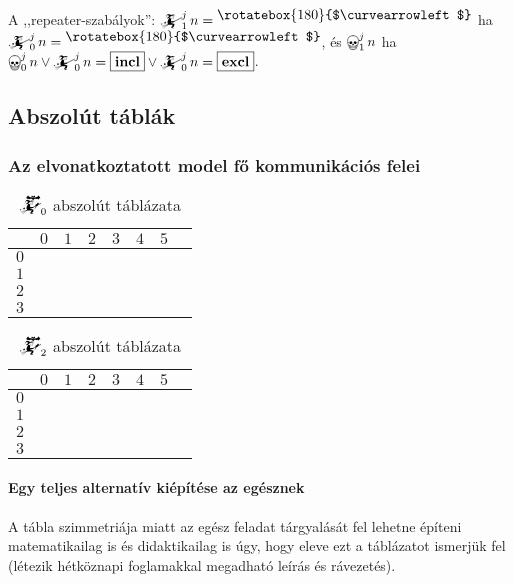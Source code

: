\documentclass{article}
\newcommand{\blk}{\cellcolor{darkgray}}
\newcommand{\red}{\cellcolor{red!33}}
\newcommand{\grn}{\cellcolor{green!33}}
\newcommand{\nothing}{\text{\raisebox{0.4em}{\rotatebox{180}{$\curvearrowleft$}}}}%
\newcommand{\just}[1]{\boxed{#1}}%
\newcommand{\incl}{\mathbf{incl}}
\newcommand{\excl}{\mathbf{excl}}
\newcommand{\mainfun}[3]{\mathwitch_{#1}^{#2}#3}
\newcommand{\nomainfun}[3]{\bigskull_{#1}^{#2}#3}
\newcommand{\currymainfunabs}[1]{\overbat{\mathwitch*_{#1}}}
\begin{document}
	A ,,repeater-szabályok'': $\mainfun1jn = \nothing$ ha $\mainfun0jn = \nothing$, és $\nomainfun1jn$ ha $\nomainfun0jn \lor \mainfun0jn = \just\incl \lor \mainfun0jn = \just\excl$.

	\subsection{Abszolút táblák}

	\subsubsection{Az elvonatkoztatott model fő kommunikációs felei}

	\begin{table}[H]
		\caption*{$\currymainfunabs0$ abszolút táblázata}
		\centering
		\begin{tabular}{c||c|c|c|c|c|c|c|}
				&	$0$		&	$1$		&	$2$		&	$3$		&	$4$		&	$5$		\\\hline\hline
			$0$	&	\nothing	&	\nothing	&	\nothing	&	\nothing	&	\nothing	&	\grn\just\incl	\\\hline
			$1$	&	\red\just\excl	&	\nothing	&	\nothing	&	\nothing	&	\grn\just\incl	&	\blk		\\\hline
			$2$	&	\blk		&	\red\just\excl	&	\nothing	&	\grn\just\incl	&	\blk		&	\blk		\\\hline
			$3$	&	\blk		&	\blk		&	\blk		&	\blk		&	\blk		&	\blk		\\\hline
		\end{tabular}
	\end{table}

	\begin{table}[H]
		\caption*{$\currymainfunabs2$ abszolút táblázata}
		\centering
		\begin{tabular}{c||c|c|c|c|c|c|c|}
				&	$0$		&	$1$		&	$2$		&	$3$		&	$4$		&	$5$		\\\hline\hline
		$0$	&	\red\just\excl	&	\nothing	&	\nothing	&	\nothing	&	\nothing	&	\grn\just\incl	\\\hline
		$1$	&	\blk		&	\red\just\excl	&	\nothing	&	\nothing	&	\grn\just\incl	&	\blk		\\\hline
		$2$	&	\blk		&	\blk		&	\red\just\excl	&	\grn\just\incl	&	\blk		&	\blk		\\\hline
		$3$	&	\blk		&	\blk		&	\blk		&	\blk		&	\blk		&	\blk		\\\hline
		\end{tabular}
	\end{table}

	\paragraph{Egy teljes alternatív kiépítése az egésznek}
	A tábla szimmetriája miatt az egész feladat tárgyalását fel lehetne építeni matematikailag is és didaktikailag is úgy, hogy eleve  ezt a táblázatot ismerjük fel (létezik hétköznapi foglamakkal megadható leírás és rávezetés).
\end{document}
